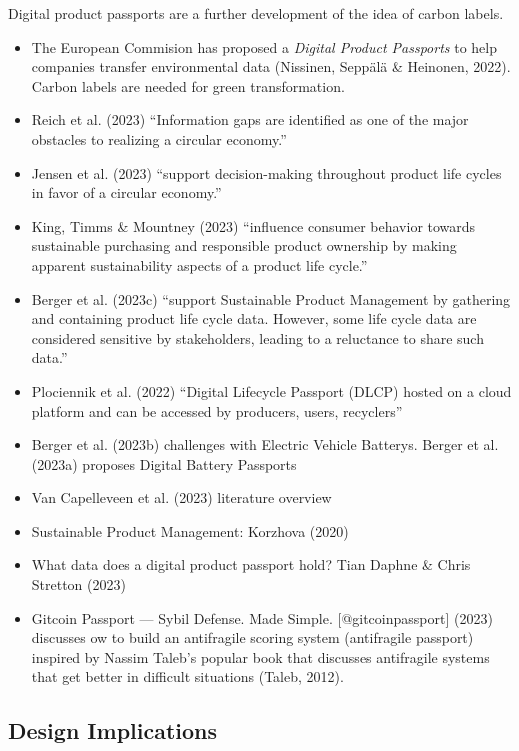 \documentclass[
  letterpaper,
  DIV=11,
  numbers=noendperiod]{scrartcl}
\begin{document}
Digital product passports are a further development of the idea of
carbon labels.

\begin{itemize}
\item
  The European Commision has proposed a \emph{Digital Product Passports}
  to help companies transfer environmental data (Nissinen, Seppälä \&
  Heinonen, 2022). Carbon labels are needed for green transformation.
\item
  Reich et al. (2023) ``Information gaps are identified as one of the
  major obstacles to realizing a circular economy.''
\item
  Jensen et al. (2023) ``support decision-making throughout product life
  cycles in favor of a circular economy.''
\item
  King, Timms \& Mountney (2023) ``influence consumer behavior towards
  sustainable purchasing and responsible product ownership by making
  apparent sustainability aspects of a product life cycle.''
\item
  Berger et al. (2023c) ``support Sustainable Product Management by
  gathering and containing product life cycle data. However, some life
  cycle data are considered sensitive by stakeholders, leading to a
  reluctance to share such data.''
\item
  Plociennik et al. (2022) ``Digital Lifecycle Passport (DLCP) hosted on
  a cloud platform and can be accessed by producers, users, recyclers''
\item
  Berger et al. (2023b) challenges with Electric Vehicle Batterys.
  Berger et al. (2023a) proposes Digital Battery Passports
\item
  Van Capelleveen et al. (2023) literature overview
\item
  Sustainable Product Management: Korzhova (2020)
\item
  What data does a digital product passport hold? Tian Daphne \& Chris
  Stretton (2023)
\item
  Gitcoin Passport --- Sybil Defense. Made Simple.
  {[}@gitcoinpassport{]} (2023) discusses ow to build an antifragile
  scoring system (antifragile passport) inspired by Nassim Taleb's
  popular book that discusses antifragile systems that get better in
  difficult situations (Taleb, 2012).
\end{itemize}

\subsection{Design Implications}\label{design-implications-2}
\end{document}
